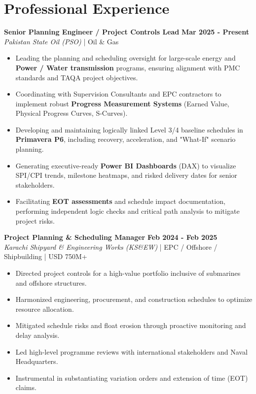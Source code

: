 \documentclass[11pt,a4paper]{article}
\begin{document}
\section{Professional Experience}
\noindent \textbf{\large Senior Planning Engineer / Project Controls Lead} \hfill \textbf{\color{awesome-blue}Mar 2025 - Present}\\
\textit{Pakistan State Oil (PSO)} | Oil \& Gas\\
\begin{itemize}
    \item Leading the planning and scheduling oversight for large-scale energy and \textbf{Power / Water transmission} programs, ensuring alignment with PMC standards and TAQA project objectives.
    \item Coordinating with Supervision Consultants and EPC contractors to implement robust \textbf{Progress Measurement Systems} (Earned Value, Physical Progress Curves, S-Curves).
    \item Developing and maintaining logically linked Level 3/4 baseline schedules in \textbf{Primavera P6}, including recovery, acceleration, and "What-If" scenario planning.
    \item Generating executive-ready \textbf{Power BI Dashboards} (DAX) to visualize SPI/CPI trends, milestone heatmaps, and risked delivery dates for senior stakeholders.
    \item Facilitating \textbf{EOT assessments} and schedule impact documentation, performing independent logic checks and critical path analysis to mitigate project risks.
\end{itemize}

\noindent \textbf{\large Project Planning \& Scheduling Manager} \hfill \textbf{\color{awesome-blue}Feb 2024 - Feb 2025}\\
\textit{Karachi Shipyard \& Engineering Works (KS\&EW)} | EPC / Offshore / Shipbuilding | USD 750M+\\
\begin{itemize}
    \item Directed project controls for a high-value portfolio inclusive of submarines and offshore structures.
    \item Harmonized engineering, procurement, and construction schedules to optimize resource allocation.
    \item Mitigated schedule risks and float erosion through proactive monitoring and delay analysis.
    \item Led high-level programme reviews with international stakeholders and Naval Headquarters.
    \item Instrumental in substantiating variation orders and extension of time (EOT) claims.
\end{itemize}
\end{document}
